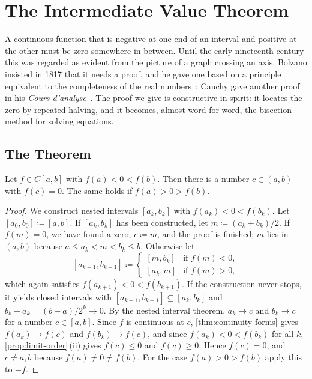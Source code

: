 \section{The Intermediate Value Theorem}
\label{sec:ivt}

A continuous function that is negative at one end of an interval and positive at the other must be zero somewhere in between. Until the early nineteenth century this was regarded as evident from the picture of a graph crossing an axis. Bolzano insisted in 1817 that it needs a proof, and he gave one based on a principle equivalent to the completeness of the real numbers~\cite{bolzano1817,russ1980}; Cauchy gave another proof in his \emph{Cours d'analyse}~\cite{cauchy1821}. The proof we give is constructive in spirit: it locates the zero by repeated halving, and it becomes, almost word for word, the bisection method for solving equations.

\subsection{The Theorem}

\begin{theorem}
\label{thm:bolzano}
Let $f\in C[a,b]$ with $f(a)<0<f(b)$. Then there is a number $c\in(a,b)$ with $f(c)=0$. The same holds if $f(a)>0>f(b)$.
\end{theorem}

\begin{proof}
We construct nested intervals $[a_k,b_k]$ with $f(a_k)<0<f(b_k)$. Let $[a_0,b_0]\coloneqq[a,b]$. If $[a_k,b_k]$ has been constructed, let $m\coloneqq(a_k+b_k)/2$. If $f(m)=0$, we have found a zero, $c\coloneqq m$, and the proof is finished; $m$ lies in $(a,b)$ because $a\le a_k<m<b_k\le b$. Otherwise let
\[
[a_{k+1},b_{k+1}]\coloneqq
\begin{cases}
[m,b_k] & \text{if }f(m)<0,\\
[a_k,m] & \text{if }f(m)>0,
\end{cases}
\]
which again satisfies $f(a_{k+1})<0<f(b_{k+1})$. If the construction never stops, it yields closed intervals with $[a_{k+1},b_{k+1}]\subseteq[a_k,b_k]$ and $b_k-a_k=(b-a)/2^k\to0$. By the nested interval theorem, $a_k\to c$ and $b_k\to c$ for a number $c\in[a,b]$. Since $f$ is continuous at $c$, \cref{thm:continuity-forms} gives $f(a_k)\to f(c)$ and $f(b_k)\to f(c)$, and since $f(a_k)<0<f(b_k)$ for all $k$, \cref{prop:limit-order}\,(ii) gives $f(c)\le0$ and $f(c)\ge0$. Hence $f(c)=0$, and $c\ne a,b$ because $f(a)\ne0\ne f(b)$. For the case $f(a)>0>f(b)$ apply this to $-f$.
\end{proof}

